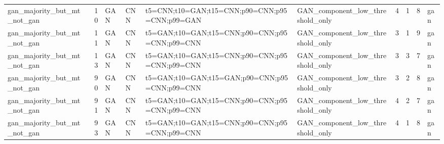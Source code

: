 \begin{tabular}{lrllllrrrl}
gan_majority_but_mt_not_gan & 10 & GAN & CNN & t5=CNN;t10=GAN;t15=CNN;p90=CNN;p95=CNN;p99=GAN & GAN_component_low_threshold_only & 4 & 1 & 8 & gan \\
gan_majority_but_mt_not_gan & 11 & GAN & CNN & t5=GAN;t10=GAN;t15=CNN;p90=CNN;p95=CNN;p99=CNN & GAN_component_low_threshold_only & 3 & 1 & 9 & gan \\
gan_majority_but_mt_not_gan & 13 & GAN & CNN & t5=GAN;t10=GAN;t15=CNN;p90=CNN;p95=CNN;p99=CNN & GAN_component_low_threshold_only & 3 & 3 & 7 & gan \\
gan_majority_but_mt_not_gan & 90 & GAN & CNN & t5=GAN;t10=GAN;t15=GAN;p90=CNN;p95=CNN;p99=CNN & GAN_component_low_threshold_only & 3 & 2 & 8 & gan \\
gan_majority_but_mt_not_gan & 91 & GAN & CNN & t5=GAN;t10=GAN;t15=CNN;p90=CNN;p95=CNN;p99=CNN & GAN_component_low_threshold_only & 4 & 2 & 7 & gan \\
gan_majority_but_mt_not_gan & 93 & GAN & CNN & t5=GAN;t10=GAN;t15=CNN;p90=CNN;p95=CNN;p99=CNN & GAN_component_low_threshold_only & 4 & 1 & 8 & gan \\
\bottomrule
\end{tabular}
